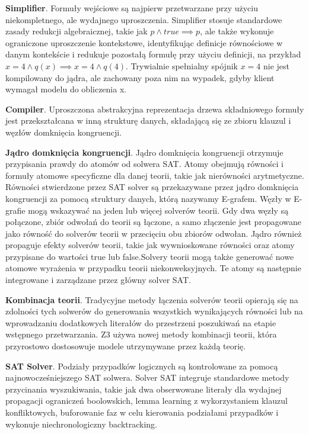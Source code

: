 \textbf{Simplifier}. Formuły wejściowe są najpierw przetwarzane przy użyciu niekompletnego, ale wydajnego uproszczenia. Simplifier stosuje standardowe zasady redukcji algebraicznej, takie jak $p \land true \implies p$, ale także wykonuje ograniczone uproszczenie kontekstowe, identyfikując definicje równościowe w danym kontekście i redukuje pozostałą formułę przy użyciu definicji, na przykład $x = 4 \land q(x) \implies x = 4 \land q(4)$. Trywialnie spełnialny spójnik $x = 4$ nie jest kompilowany do jądra, ale zachowany poza nim na wypadek, gdyby klient wymagał modelu do obliczenia x.

\textbf{Compiler}. Uproszczona abstrakcyjna reprezentacja drzewa składniowego formuły jest przekształcana w inną strukturę danych, składającą się ze zbioru klauzul i węzłów domknięcia kongruencji.

\textbf{Jądro domknięcia kongruencji}. Jądro domknięcia kongruencji otrzymuje przypisania prawdy do atomów od solwera SAT. Atomy obejmują równości i formuły atomowe specyficzne dla danej teorii, takie jak nierówności arytmetyczne. Równości stwierdzone przez SAT solver są przekazywane przez jądro domknięcia kongruencji za pomocą struktury danych, którą nazywamy E-grafem. Węzły w E-grafie mogą wskazywać na jeden lub więcej solverów teorii. Gdy dwa węzły są połączone, zbiór odwołań do teorii są łączone, a samo złączenie jest propagowane jako równość do solverów teorii w przecięciu obu zbiorów odwołan. Jądro również propaguje efekty solverów teorii, takie jak wywnioskowane równości oraz atomy przypisane do wartości true lub false.Solvery teorii mogą także generować nowe atomowe wyrażenia w przypadku teorii niekonweksyjnych. Te atomy są następnie integrowane i zarządzane przez główny solver SAT.

\textbf{Kombinacja teorii}. Tradycyjne metody łączenia solverów teorii opierają się na zdolności tych solwerów do generowania wszystkich wynikających równości lub na wprowadzaniu dodatkowych literałów do przestrzeni poszukiwań na etapie wstępnego przetwarzania. Z3 używa nowej metody kombinacji teorii, która przyrostowo dostosowuje modele utrzymywane przez każdą teorię.

\textbf{SAT Solver}. Podziały przypadków logicznych są kontrolowane za pomocą najnowocześniejszego SAT solwera. Solver SAT integruje standardowe metody przycinania wyszukiwania, takie jak dwa obserwowane literały dla wydajnej propagacji ograniczeń boolowskich, lemma learning z wykorzystaniem klauzul konfliktowych, buforowanie faz w celu kierowania podziałami przypadków i wykonuje niechronologiczny backtracking.


